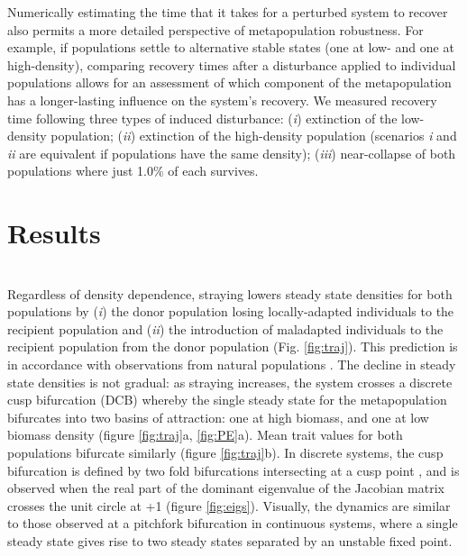 \documentclass{revtex4}
\begin{document}
Numerically estimating the time that it takes for a perturbed system to recover also permits a more detailed perspective of metapopulation robustness.
For example, if populations settle to alternative stable states (one at low- and one at high-density), comparing recovery times after a disturbance applied to individual populations allows for an assessment of which component of the metapopulation has a longer-lasting influence on the system's recovery. %
We measured recovery time following three types of induced disturbance: (\emph{i}) extinction of the low-density population; (\emph{ii}) extinction of the high-density population (scenarios \emph{i} and \emph{ii} are equivalent if populations have the same density); (\emph{iii}) near-collapse of both populations where just 1.0\% of each survives.
\\


\section{Results}


 \\
\noindent Regardless of density dependence, straying lowers steady state densities for both populations by (\emph{i}) the donor population losing locally-adapted individuals to the recipient population and (\emph{ii}) the introduction of maladapted individuals to the recipient population from the donor population (Fig. \ref{fig:traj}).
This prediction is in accordance with observations from natural populations \citep{Bett:2017ha}. %
The decline in steady state densities is not gradual: as straying increases, the system crosses a discrete cusp bifurcation (DCB) \citep{AleksandrovichKuznetsov:1995p2580} whereby the single steady state for the metapopulation bifurcates into two basins of attraction: one at high biomass, and one at low biomass density (figure \ref{fig:traj}a, \ref{fig:PE}a).
Mean trait values for both populations bifurcate similarly (figure \ref{fig:traj}b). 
In discrete systems, the cusp bifurcation is defined by two fold bifurcations intersecting at a cusp point \citep{AleksandrovichKuznetsov:1995p2580}, and is observed when the real part of the dominant eigenvalue of the Jacobian matrix crosses the unit circle at +1 (figure \ref{fig:eigs}).
Visually, the dynamics are similar to those observed at a pitchfork bifurcation in continuous systems, where a single steady state gives rise to two steady states separated by an unstable fixed point.
\end{document}
